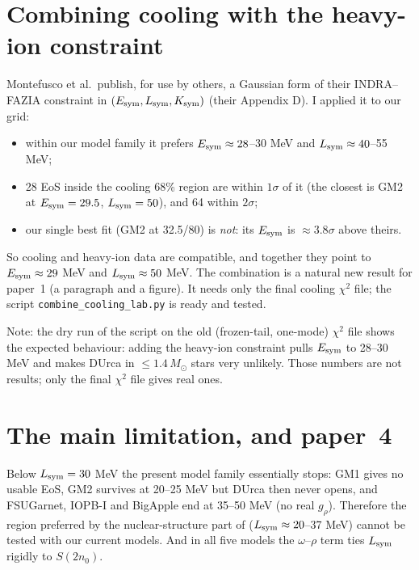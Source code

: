 \documentclass[11pt,a4paper]{article}
\newcommand{\Esym}{E_{\rm sym}}
\newcommand{\Lsym}{L_{\rm sym}}
\newcommand{\Msun}{M_\odot}
\begin{document}
\section{Combining cooling with the heavy-ion constraint}\label{sec:if}
Montefusco et al.\ publish, for use by others, a Gaussian form of their INDRA--FAZIA constraint in $(\Esym,\Lsym,K_{\rm sym})$ (their Appendix D). I applied it to our grid:
\begin{itemize}
\item within our model family it prefers $\Esym\approx28$--30 MeV and $\Lsym\approx40$--55 MeV;
\item 28 EoS inside the cooling 68\% region are within $1\sigma$ of it (the closest is GM2 at $\Esym=29.5$, $\Lsym=50$), and 64 within $2\sigma$;
\item our single best fit (GM2 at 32.5/80) is \emph{not}: its $\Esym$ is $\approx3.8\sigma$ above theirs.
\end{itemize}
So cooling and heavy-ion data are compatible, and together they point to $\Esym\approx29$ MeV and $\Lsym\approx50$ MeV. The combination is a natural new result for paper~1 (a paragraph and a figure). It needs only the final cooling $\chi^2$ file; the script \texttt{combine\_cooling\_lab.py} is ready and tested.

Note: the dry run of the script on the old (frozen-tail, one-mode) $\chi^2$ file shows the expected behaviour: adding the heavy-ion constraint pulls $\Esym$ to 28--30 MeV and makes DUrca in $\le1.4\,\Msun$ stars very unlikely. Those numbers are not results; only the final $\chi^2$ file gives real ones.

\section{The main limitation, and paper~4}
Below $\Lsym=30$ MeV the present model family essentially stops: GM1 gives no usable EoS, GM2 survives at 20--25 MeV but DUrca then never opens, and FSUGarnet, IOPB-I and BigApple end at 35--50 MeV (no real $g_\rho$). Therefore the region preferred by the nuclear-structure part of \cite{Montefusco2026} ($\Lsym\approx20$--37 MeV) cannot be tested with our current models. And in all five models the $\omega$--$\rho$ term ties $\Lsym$ rigidly to $S(2n_0)$.
\end{document}
